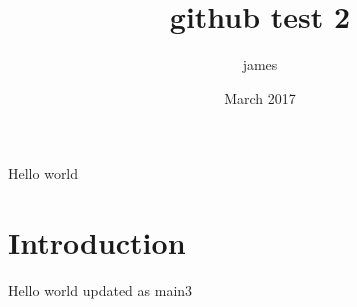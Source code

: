 \documentclass{article}
\title{github test 2}
\author{james }
\date{March 2017}
\begin{document}
\maketitle

Hello world

\section{Introduction}

Hello world updated as main3
\end{document}
